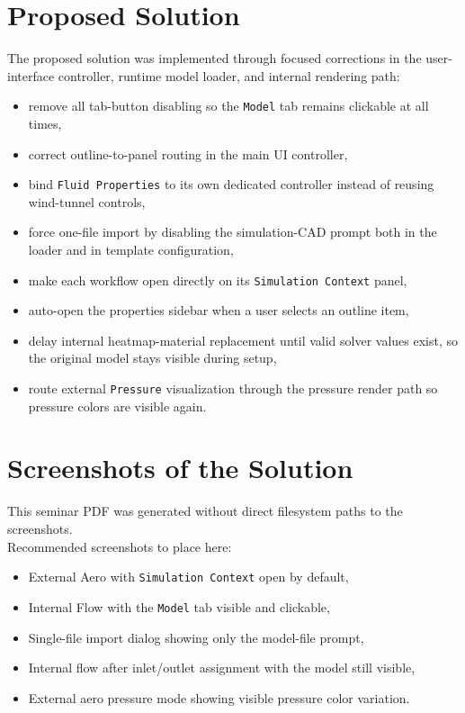 \documentclass[11pt,a4paper]{article}
\begin{document}
\section{Proposed Solution}
The proposed solution was implemented through focused corrections in the user-interface controller, runtime model loader, and internal rendering path:
\begin{itemize}
  \item remove all tab-button disabling so the \texttt{Model} tab remains clickable at all times,
  \item correct outline-to-panel routing in the main UI controller,
  \item bind \texttt{Fluid Properties} to its own dedicated controller instead of reusing wind-tunnel controls,
  \item force one-file import by disabling the simulation-CAD prompt both in the loader and in template configuration,
  \item make each workflow open directly on its \texttt{Simulation Context} panel,
  \item auto-open the properties sidebar when a user selects an outline item,
  \item delay internal heatmap-material replacement until valid solver values exist, so the original model stays visible during setup,
  \item route external \texttt{Pressure} visualization through the pressure render path so pressure colors are visible again.
\end{itemize}

\section{Screenshots of the Solution}
\begin{tcolorbox}[colback=gray!8,colframe=gray!55,title=Screenshot Placeholder]
This seminar PDF was generated without direct filesystem paths to the screenshots.\\

Recommended screenshots to place here:
\begin{itemize}
  \item External Aero with \texttt{Simulation Context} open by default,
  \item Internal Flow with the \texttt{Model} tab visible and clickable,
  \item Single-file import dialog showing only the model-file prompt,
  \item Internal flow after inlet/outlet assignment with the model still visible,
  \item External aero pressure mode showing visible pressure color variation.
\end{itemize}
\end{tcolorbox}
\end{document}
